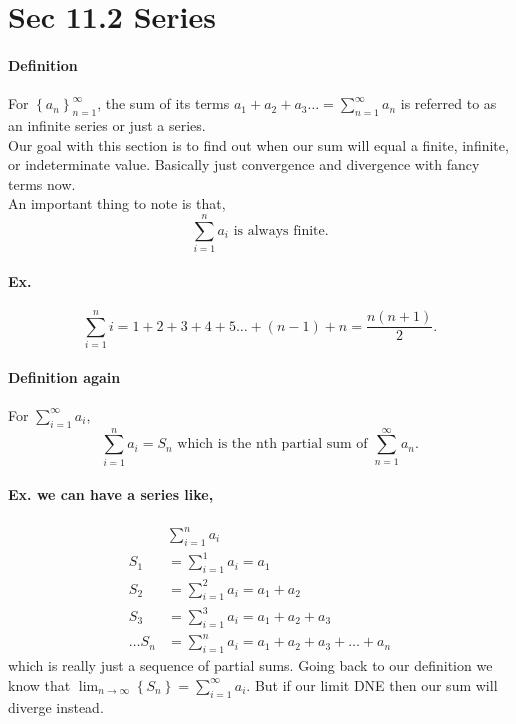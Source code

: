 \documentclass[a4paper]{article}
\begin{document}
\section{Sec 11.2 Series}%
\label{sec:Sec 11.2 Series}

\paragraph{Definition\\}
For $ \left\{ a_n \right\} ^{ \infty }_{ n=1 } $, the sum of its terms $ a_1 + a_2 + a_3 \ldots = \sum_{ n=1 } ^{ \infty } a_n$ is referred to as an infinite series or just a series. \\

Our goal with this section is to find out when our sum will equal a finite, infinite, or indeterminate value. Basically just convergence and divergence with fancy terms now. \\

An important thing to note is that,
\[
\sum_{ i=1 } ^{ n } a_{ i } \text{ is always finite}
.\] 

\paragraph{Ex.}
\[
\sum_{ i=1 } ^{ n } i= 1+2+3+4+5\ldots + \left( n-1 \right) + n = \frac{ n\left( n+1 \right)  }{ 2 }
.\] 

\newpage
\paragraph{Definition again\\}
For $ \sum_{ i=1 } ^{ \infty } a_i $, 
\[
\sum_{ i=1 } ^{ n } a_i = S_n \text{ which is the nth partial sum of }\sum_{ n=1 } ^{ \infty } a_n
.\] 

\paragraph{Ex. we can have a series like,}
\begin{align*}
&\sum_{ i=1 } ^{ n } a_i \\
S_1 &= \sum_{ i=1 } ^{ 1 } a_i = a_1 \\
S_2 &= \sum_{ i=1 } ^{ 2 } a_i = a_1 + a_2 \\
S_3 &= \sum_{ i=1 } ^{ 3 } a_i = a_1 + a_2 + a_3 \\
\ldots
S_n &= \sum_{ i=1 } ^{ n } a_i = a_1 + a_2 + a_3 + \ldots + a_n
\end{align*}
which is really just a sequence of partial sums. Going back to our definition we know that $ \lim_{ n \to \infty} \left\{ S_n \right\} =\sum_{ i=1 } ^{ \infty } a_i $. But if our limit DNE then our sum will diverge instead. 
\end{document}
